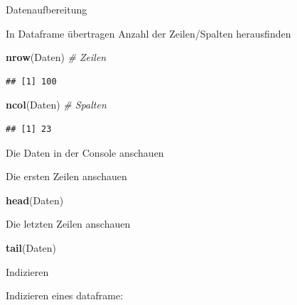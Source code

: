 \documentclass[ignorenonframetext,]{beamer}
\newenvironment{Shaded}{}{}
\newcommand{\KeywordTok}[1]{\textcolor[rgb]{0.00,0.44,0.13}{\textbf{{#1}}}}
\newcommand{\CommentTok}[1]{\textcolor[rgb]{0.38,0.63,0.69}{\textit{{#1}}}}
\newcommand{\NormalTok}[1]{{#1}}
\begin{document}
\begin{frame}[fragile]{Datenaufbereitung}
\begin{block}{In Dataframe übertragen}
Anzahl der Zeilen/Spalten herausfinden

\begin{Shaded}
\begin{Highlighting}[]
\KeywordTok{nrow}\NormalTok{(Daten) }\CommentTok{# Zeilen}
\end{Highlighting}
\end{Shaded}

\begin{verbatim}
## [1] 100
\end{verbatim}

\begin{Shaded}
\begin{Highlighting}[]
\KeywordTok{ncol}\NormalTok{(Daten) }\CommentTok{# Spalten}
\end{Highlighting}
\end{Shaded}

\begin{verbatim}
## [1] 23
\end{verbatim}

\end{block}

\begin{block}{Die Daten in der Console anschauen}

\begin{block}{Die ersten Zeilen anschauen}

\begin{Shaded}
\begin{Highlighting}[]
\KeywordTok{head}\NormalTok{(Daten)}
\end{Highlighting}
\end{Shaded}

\end{block}

\begin{block}{Die letzten Zeilen anschauen}

\begin{Shaded}
\begin{Highlighting}[]
\KeywordTok{tail}\NormalTok{(Daten)}
\end{Highlighting}
\end{Shaded}

\end{block}

\end{block}

\begin{block}{Indizieren}

Indizieren eines dataframe:


\end{block}
\end{frame}
\end{document}
